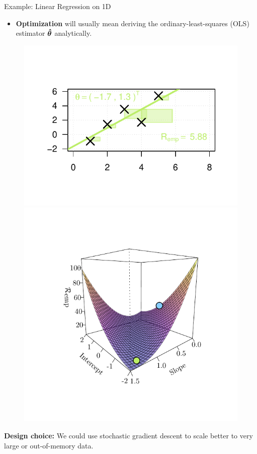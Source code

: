 \documentclass[11pt,compress,t,notes=noshow, xcolor=table]{beamer}
\begin{document}
\begin{vbframe}{Example: Linear Regression on 1D}
  \framebreak
\begin{itemize}
  \item \textbf{Optimization} will usually mean deriving the
  ordinary-least-squares (OLS) estimator $\bm{\hat\theta}$ analytically.


\end{itemize}
\begin{figure}[!htb]
\includegraphics[trim=1.5cm 1.5cm 1.5cm 1.5cm, width=\linewidth]{figure/lm_reg2}
\endminipage\hfill
{}
\includegraphics[trim=1.5cm 1.5cm 1.5cm 1.5cm, width=\linewidth]{figure/lm_reg4}
\endminipage

\end{figure}
  \textbf{Design choice:} We could use stochastic gradient descent to scale better to very large or out-of-memory data.

\end{vbframe}
\end{document}

